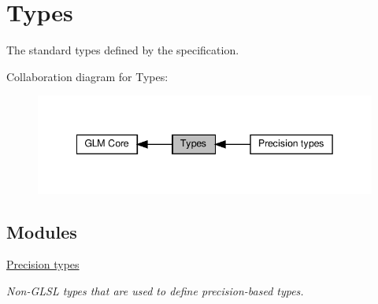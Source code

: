 \hypertarget{group__core__types}{}\section{Types}
\label{group__core__types}


The standard types defined by the specification.  


Collaboration diagram for Types\+:\nopagebreak
\begin{figure}[H]
\begin{center}
\leavevmode
\includegraphics[width=342pt]{group__core__types}
\end{center}
\end{figure}
\subsection*{Modules}
\begin{DoxyCompactItemize}
\item 
\hyperlink{group__core__precision}{Precision types}
\begin{DoxyCompactList}\small\item\em Non-\/\+G\+L\+SL types that are used to define precision-\/based types. \end{DoxyCompactList}\end{DoxyCompactItemize}
